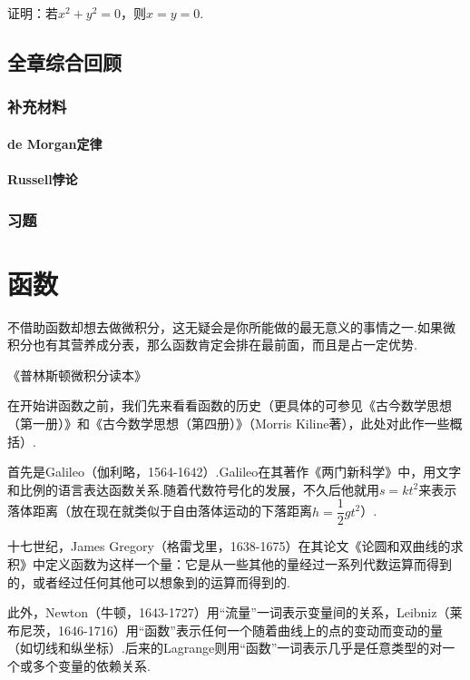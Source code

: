\documentclass[lang=cn,math=cm,chinesefont=nofont,11pt,scheme=chinese,twocol]{elegantbook}
\begin{document}
\begin{exercise}\label{2003RJA_xx2-1_P7.exp4}
  证明：若$x^2+y^2=0$，则$x=y=0$.
\end{exercise}

\section{全章综合回顾}

\subsection{补充材料}

\subsubsection{de Morgan定律}

\subsubsection{Russell悖论}

\subsection{习题}

\chapter{函数}

\epigraph{不借助函数却想去做微积分，这无疑会是你所能做的最无意义的事情之一.如果微积分也有其营养成分表，那么函数肯定会排在最前面，而且是占一定优势.}{《普林斯顿微积分读本》}

在开始讲函数之前，我们先来看看函数的历史（更具体的可参见《古今数学思想（第一册）》和《古今数学思想（第四册）》（Morris Kiline著），此处对此作一些概括）.

首先是Galileo（伽利略，1564-1642）.Galileo在其著作《两门新科学》中，用文字和比例的语言表达函数关系.随着代数符号化的发展，不久后他就用$s=kt^2$来表示落体距离（放在现在就类似于自由落体运动的下落距离$h=\dfrac{1}{2}gt^2$）.

十七世纪，James Gregory（格雷戈里，1638-1675）在其论文《论圆和双曲线的求积》中定义函数为这样一个量：它是从一些其他的量经过一系列代数运算而得到的，或者经过任何其他可以想象到的运算而得到的.

此外，Newton（牛顿，1643-1727）用“流量”一词表示变量间的关系，Leibniz（莱布尼茨，1646-1716）用“函数”表示任何一个随着曲线上的点的变动而变动的量（如切线和纵坐标）.后来的Lagrange则用“函数”一词表示几乎是任意类型的对一个或多个变量的依赖关系.
\end{document}
